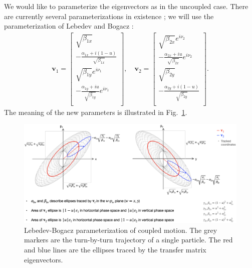 We would like to parameterize the eigenvectors as in the uncoupled case. There are currently several parameterizations in existence \cite{Edwards1973, Ripken1989, Wolski2006, Lebedev2010, Qin2009}; we will use the parameterization of Lebedev and Bogacz \cite{Lebedev2010}:
%
\begingroup
\renewcommand*{\arraystretch}{1.1}
\begin{equation}
\begin{aligned}
    \mathbf{v}_1 = 
    \begin{bmatrix}
        \sqrt{\beta_{1x}} \\
        -\frac{\alpha_{1x} + i(1-u)}{\sqrt{\beta_{1x}}} \\
        \sqrt{\beta_{1y}}e^{i\nu_1} \\
        -\frac{\alpha_{1y} + iu}{\sqrt{\beta_{1y}}} e^{i\nu_1} \\
    \end{bmatrix} ,\quad
    \mathbf{v}_2 = 
    \begin{bmatrix}
        \sqrt{\beta_{2x}}e^{i\nu_2} \\
        -\frac{\alpha_{2x} + iu}{\sqrt{\beta_{2x}}}e^{i\nu_2} \\
        \sqrt{\beta_{2y}} \\
        -\frac{\alpha_{2y} + i(1-u)}{\sqrt{\beta_{2y}}} \\
    \end{bmatrix}.
\end{aligned}
\end{equation}
\endgroup
%
The meaning of the new parameters is illustrated in Fig.~\ref{fig:twiss4D}.
%
\begin{figure}[!p]
    \centering
    \includegraphics[width=\textwidth]{Images/chapter1/twiss4D.png}
    \vspace*{0.1cm}
    \caption{Lebedev-Bogacz parameterization of coupled motion. The grey markers are the turn-by-turn trajectory of a single particle. The red and blue lines are the ellipses traced by the transfer matrix eigenvectors.}
    \label{fig:twiss4D}
\end{figure}
